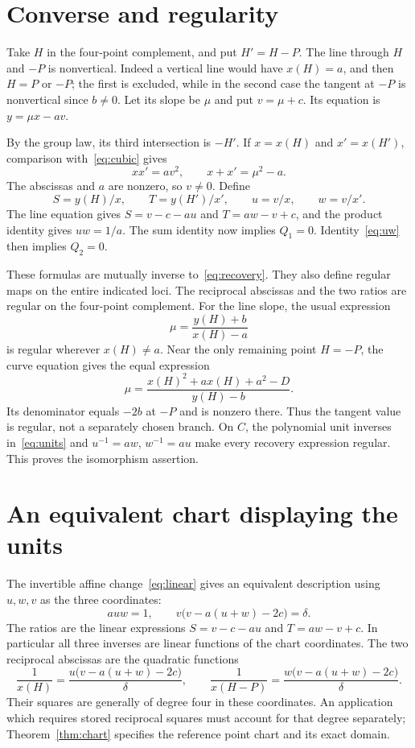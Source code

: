 \documentclass[11pt,a4paper]{article}
\begin{document}
\section{Converse and regularity}
Take $H$ in the four-point complement, and put $H'=H-P$.
The line through $H$ and $-P$ is nonvertical. Indeed a vertical line
would have $x(H)=a$, and then $H=P$ or $-P$; the first is excluded,
while in the second case the tangent at $-P$ is nonvertical since
$b\ne0$. Let its slope be $\mu$ and put $v=\mu+c$. Its equation is
$y=\mu x-av$.

By the group law, its third intersection is $-H'$. If
$x=x(H)$ and $x'=x(H')$, comparison with~\eqref{eq:cubic} gives
\[
                         xx'=av^2,\qquad x+x'=\mu^2-a.
\]
The abscissas and $a$ are nonzero, so $v\ne0$. Define
\[
 S=y(H)/x,\qquad T=y(H')/x',\qquad u=v/x,\qquad w=v/x'.
\]
The line equation gives $S=v-c-au$ and $T=aw-v+c$, and the product
identity gives $uw=1/a$. The sum identity now implies $Q_1=0$.
Identity~\eqref{eq:uw} then implies $Q_2=0$.

These formulas are mutually inverse to~\eqref{eq:recovery}. They
also define regular maps on the entire indicated loci. The reciprocal
abscissas and the two ratios are regular on the four-point complement.
For the line slope, the usual expression
\[
                         \mu=\frac{y(H)+b}{x(H)-a}
\]
is regular wherever $x(H)\ne a$. Near the only remaining point
$H=-P$, the curve equation gives the equal expression
\[
             \mu=\frac{x(H)^2+a x(H)+a^2-D}{y(H)-b}.
\]
Its denominator equals $-2b$ at $-P$ and is nonzero there. Thus the
tangent value is regular, not a separately chosen branch. On $C$,
the polynomial unit inverses in~\eqref{eq:units} and
$u^{-1}=aw$, $w^{-1}=au$ make every recovery expression regular.
This proves the isomorphism assertion.

\section{An equivalent chart displaying the units}
The invertible affine change~\eqref{eq:linear} gives an equivalent
description using $u,w,v$ as the three coordinates:
\begin{equation}\label{eq:unit-chart}
              auw=1,\qquad
              v\bigl(v-a(u+w)-2c\bigr)=\delta.
\end{equation}
The ratios are the linear expressions
$S=v-c-au$ and $T=aw-v+c$. In particular all three inverses are
linear functions of the chart coordinates. The two reciprocal
abscissas are the quadratic functions
\[
 \frac1{x(H)}=\frac{u\bigl(v-a(u+w)-2c\bigr)}{\delta},
 \qquad
 \frac1{x(H-P)}=\frac{w\bigl(v-a(u+w)-2c\bigr)}{\delta}.
\]
Their squares are generally of degree four in these coordinates.
An application which requires stored reciprocal squares must account
for that degree separately; Theorem~\ref{thm:chart} specifies the
reference point chart and its exact domain.
\end{document}
